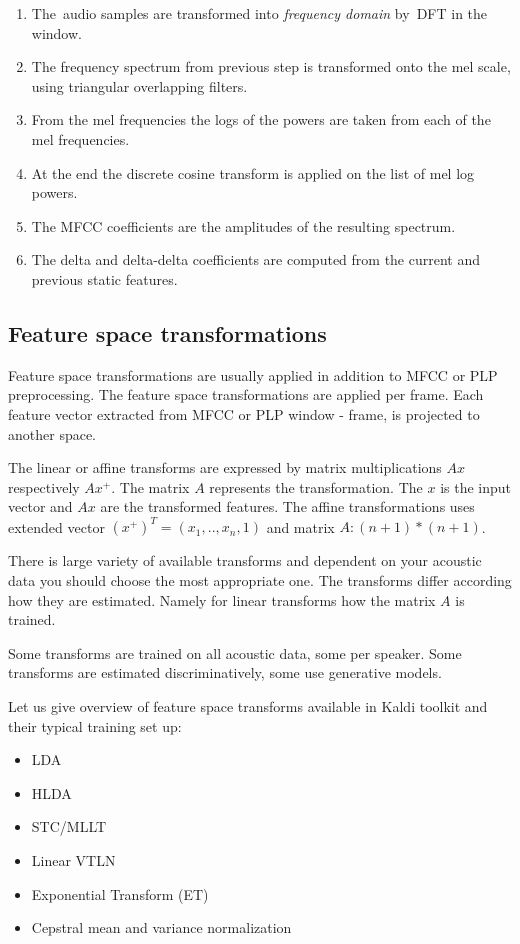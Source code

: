 \small{\begin{enumerate}
    \item The~audio samples are transformed into {\it frequency domain}\/ by~\ac{DFT} in the window.
    \item The frequency spectrum from previous step is transformed onto the mel scale, 
        using triangular overlapping filters.
    \item From the mel frequencies the logs of the powers are taken from each of the mel frequencies.
    \item At the end the discrete cosine transform is applied on the list of mel log powers.
    \item The \ac{MFCC} coefficients are the amplitudes of the resulting spectrum.
    \item The delta and delta-delta coefficients are computed from the current and previous static features.
\end{enumerate}


\subsection*{Feature space transformations}
Feature space transformations are usually applied in addition to \ac{MFCC} or \ac{PLP} preprocessing.
The feature space transformations are applied per frame. 
Each feature vector extracted from \ac{MFCC}
or \ac{PLP} window - frame, is projected to another space.

The linear or affine transforms are expressed by matrix multiplications $Ax$ respectively $Ax^+$.
The matrix $A$ represents the transformation. 
The $x$ is the input vector and $Ax$ are the transformed features.
The affine transformations uses extended vector $(x^+)^T = (x_1, .., x_n, 1)$ and matrix $A: (n+1)*(n+1)$.

There is large variety of available transforms and 
dependent on your acoustic data you should choose the most appropriate one.
The transforms differ according how they are estimated.
Namely for linear transforms how the matrix $A$ is trained.

Some transforms are trained on all acoustic data, some per speaker.
Some transforms are estimated discriminatively, some use generative models.

Let us give overview of feature space transforms available in Kaldi toolkit
and their typical training set up: 

\begin{itemize}
    \item LDA  \cite{TODO}
    \item HLDA  \cite{TODO}
    \item STC/MLLT \cite{TODO}
    \item Linear VTLN \cite{TODO}
    \item Exponential Transform (ET) \cite{TODO}
    \item Cepstral mean and variance normalization \cite{TODO}
\end{itemize}


}
